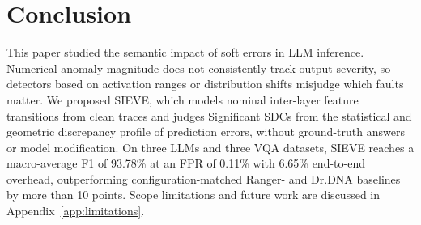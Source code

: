 \section{Conclusion}
\label{sec:conclusion}

This paper studied the semantic impact of soft errors in LLM inference. Numerical anomaly magnitude does not consistently track output severity, so detectors based on activation ranges or distribution shifts misjudge which faults matter. We proposed SIEVE, which models nominal inter-layer feature transitions from clean traces and judges Significant SDCs from the statistical and geometric discrepancy profile of prediction errors, without ground-truth answers or model modification. On three LLMs and three VQA datasets, SIEVE reaches a macro-average F1 of 93.78\% at an FPR of 0.11\% with 6.65\% end-to-end overhead, outperforming configuration-matched Ranger- and Dr.DNA baselines by more than 10 points. Scope limitations and future work are discussed in Appendix~\ref{app:limitations}.


